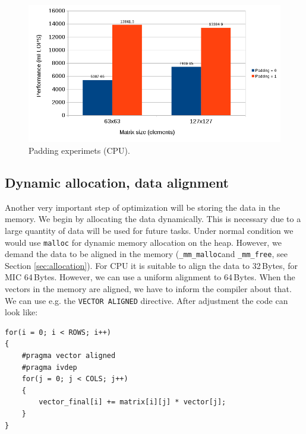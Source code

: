 \begin{figure}[htb]
    \centering
    \includegraphics[width=1\linewidth]{fig/matvec_padding_experiment.png}
    \caption{Padding experimets (CPU).}
    \label{fig:graph_matvec_padding_exp}
\end{figure}

\subsection{Dynamic allocation, data alignment}
Another very important step of optimization will be storing the data in the memory. We begin by allocating the data dynamically. This is necessary due to a large quantity of data will be used for future tasks. Under normal condition we would use \texttt{malloc} for dynamic memory allocation on the heap. However, we demand the data to be aligned in the memory (\texttt{\_mm\_malloc}and \texttt{\_mm\_free}, see Section \ref{sec:allocation}). For CPU it is suitable to align the data to 32\,Bytes, for MIC 64\,Bytes. However, we can use a uniform alignment to 64\,Bytes. When the vectors in the memory are aligned, we have to inform the compiler about that. We can use e.g. the \texttt{VECTOR ALIGNED} directive. After adjustment the code can look like:

\bigskip
\begin{lstlisting}[caption={Matrix vector multiplication pseudo code, IVDEP, VECTOR ALIGNED directives.}, captionpos=b, label=code_matvec_ivdep_aligned]
for(i = 0; i < ROWS; i++)
{
    #pragma vector aligned
    #pragma ivdep
    for(j = 0; j < COLS; j++)
    {    
        vector_final[i] += matrix[i][j] * vector[j];
    }
}
\end{lstlisting}
\bigskip

